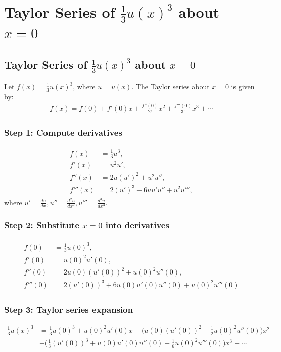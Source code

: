 \chapter{Taylor Series of \( \frac{1}{3} u(x)^3 \) about \( x = 0 \)}
\section{Taylor Series of \( \frac{1}{3} u(x)^3 \) about \( x = 0 \)}
Let \( f(x) = \frac{1}{3} u(x)^3 \), where \( u = u(x) \).
The Taylor series about \( x = 0 \) is given by:
%
\begin{align}
    f(x) = f(0) + f'(0) x + \frac{f''(0)}{2!} x^2 + \frac{f'''(0)}{3!} x^3 + \cdots
\end{align}
%
\subsection*{Step 1: Compute derivatives}
\begin{align}
    \begin{aligned}
        f(x) &= \frac{1}{3} u^3, \\
        f'(x) &= u^2 u', \\
        f''(x) &= 2 u (u')^2 + u^2 u'', \\
        f'''(x) &= 2 (u')^3 + 6 u u' u'' + u^2 u''',
    \end{aligned}
\end{align}
%
where \( u' = \frac{du}{dx}, u'' = \frac{d^2 u}{dx^2}, u''' = \frac{d^3 u}{dx^3} \).
%
\subsection*{Step 2: Substitute \( x = 0 \) into derivatives}
\begin{align}
    \begin{aligned}
        f(0) &= \frac{1}{3} u(0)^3, \\
        f'(0) &= u(0)^2 u'(0), \\
        f''(0) &= 2 u(0) (u'(0))^2 + u(0)^2 u''(0), \\
        f'''(0) &= 2 (u'(0))^3 + 6 u(0) u'(0) u''(0) + u(0)^2 u'''(0)
    \end{aligned}
\end{align}
%
\subsection*{Step 3: Taylor series expansion}
\begin{align}
    \frac{1}{3} u(x)^3 &= \frac{1}{3} u(0)^3
    + u(0)^2 u'(0) x
    + \Big( u(0) (u'(0))^2 + \frac{1}{2} u(0)^2 u''(0) \Big) x^2 +
    \\
    & + \Big( \frac{1}{3} (u'(0))^3 + u(0) u'(0) u''(0) + \frac{1}{6} u(0)^2 u'''(0) \Big) x^3 + \cdots
\end{align}
